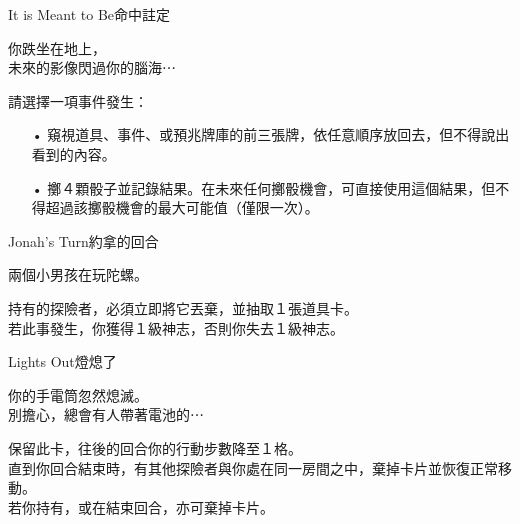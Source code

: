 %
\begin{EventCard}{It is Meant to Be}{命中註定}

  \begin{CardStory}
    你跌坐在地上，\\
    未來的影像閃過你的腦海⋯
  \end{CardStory}

  請選擇一項事件發生：
  \begin{itemize}
    \item[•] 窺視道具、事件、或預兆牌庫的前三張牌，依任意順序放回去，但不得說出看到的內容。
    \item[•] 擲４顆骰子並記錄結果。在未來任何擲骰機會，可直接使用這個結果，但不得超過該擲骰機會的最大可能值（僅限一次）。
  \end{itemize}

\end{EventCard}%
%
\begin{EventCard}{Jonah’s Turn}{約拿的回合}

  \begin{CardStory}
    兩個小男孩在玩陀螺。\\



\end{CardStory}

  持有的探險者，必須立即將它丟棄，並抽取１張道具卡。\\[0.5em]
  若此事發生，你獲得１級神志，否則你失去１級神志。\\[0.5em]

\end{EventCard}%
%
\begin{EventCard}{Lights Out}{燈熄了}

  \begin{CardStory}
    你的手電筒忽然熄滅。\\
    別擔心，總會有人帶著電池的⋯
  \end{CardStory}

  保留此卡，往後的回合你的行動步數降至１格。\\[0.5em]
  直到你回合結束時，有其他探險者與你處在同一房間之中，棄掉卡片並恢復正常移動。\\[0.5em]
  若你持有，或在結束回合，亦可棄掉卡片。\\[0.5em]

\end{EventCard}%
